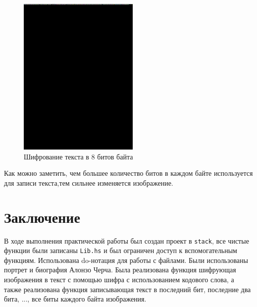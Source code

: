 \documentclass[10pt,a4paper,final]{article} %
\begin{document}
\begin{figure}[h!]
\begin{minipage}{0.3\textwidth}
		\includegraphics[width=\linewidth]{img/Haskell_8}
		\caption{Шифрование текста в 8 битов байта}
	\end{minipage}
\end{figure}

Как можно заметить, чем большее количество битов в каждом байте используется для записи текста,тем сильнее изменяется изображение.
\newpage

\section* {Заключение}
В ходе выполнения практической работы был создан проект в \texttt{stack}, все чистые функции были записаны \texttt{Lib.hs} и был ограничен доступ к вспомогательным функциям. Использована do-нотация для работы с файлами. Были использованы портрет и биография Алонзо Черча. Была реализована функция шифрующая изображения в текст с помощью шифра с использованием кодового слова, а также реализована функция записывающая текст в последний бит, последние два бита, ..., все биты каждого байта изображения.
\end{document}
